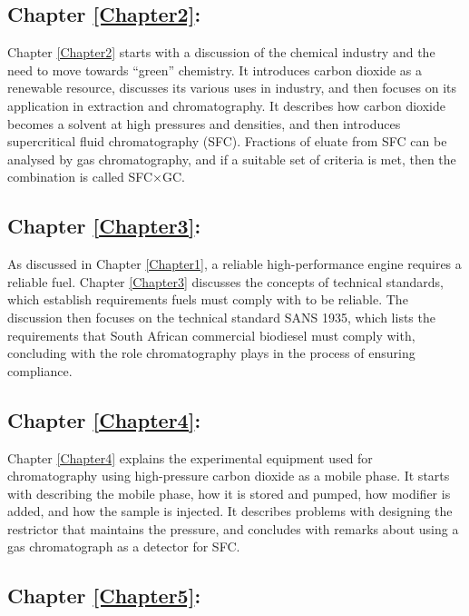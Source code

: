 \subsection{Chapter \ref{Chapter2}:  }

Chapter \ref{Chapter2} starts with a discussion of the chemical industry and the
need to move towards ``green'' chemistry. It introduces carbon dioxide as a
renewable resource, discusses its various uses in industry, and then focuses on
its application in extraction and chromatography. It describes how carbon
dioxide becomes a solvent at high pressures and densities, and then introduces
supercritical fluid chromatography (SFC). Fractions of eluate from SFC can be
analysed by gas chromatography, and if a suitable set of criteria is met, then
the combination is called SFC×GC.

\subsection{Chapter \ref{Chapter3}:  }

As discussed in Chapter \ref{Chapter1}, a reliable high-performance engine
requires a reliable fuel. Chapter \ref{Chapter3} discusses the concepts of
technical standards, which establish requirements fuels must comply with to be
reliable. The discussion then focuses on the technical standard SANS 1935, which
lists the requirements that South African commercial biodiesel must comply with,
concluding with the role chromatography plays in the process of ensuring
compliance.

\subsection{Chapter \ref{Chapter4}:  }
 
Chapter \ref{Chapter4} explains the experimental equipment used for
chromatography using high-pressure carbon dioxide as a mobile phase. It starts
with describing the mobile phase, how it is stored and pumped, how modifier is
added, and how the sample is injected. It describes problems with designing the
restrictor that maintains the pressure, and concludes with remarks about using a
gas chromatograph as a detector for SFC. 

\subsection{Chapter \ref{Chapter5}:  }

